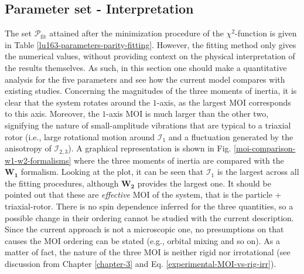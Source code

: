 \subsection{Parameter set - Interpretation}

The set $\mathcal{P}_\text{fit}$ attained after the minimization procedure of the $\chi^2$-function is given in Table \ref{lu163-parameters-parity-fitting}. However, the fitting method only gives the numerical values, without providing context on the physical interpretation of the results themselves. As such, in this section one should make a quantitative analysis for the five parameters and see how the current model compares with existing studies. Concerning the magnitudes of the three moments of inertia, it is clear that the system rotates around the $1$-axis, as the largest MOI corresponds to this axis. Moreover, the $1$-axis MOI is much larger than the other two, signifying the nature of small-amplitude vibrations that are typical to a triaxial rotor (i.e., large rotational motion around $\mathcal{I}_1$ and a fluctuation generated by the anisotropy of $\mathcal{I}_{2,3}$). A graphical representation is shown in Fig. \ref{moi-comparison-w1-w2-formalisms} where the three moments of inertia are compared with the $\mathbf{W_1}$ formalism. Looking at the plot, it can be seen that $\mathcal{I}_1$ is the largest across all the fitting procedures, although $\mathbf{W_2}$ provides the largest one. It should be pointed out that these are \emph{effective} MOI of the system, that is the particle + triaxial-rotor. There is no spin dependence inferred for the three quantities, so a possible change in their ordering cannot be studied with the current description. Since the current approach is not a microscopic one, no presumptions on that causes the MOI ordering can be stated (e.g., orbital mixing and so on). As a matter of fact, the nature of the three MOI is neither rigid nor irrotational (see discussion from Chapter \ref{chapter-3} and Eq. \ref{experimental-MOI-vs-rig-irr}).
